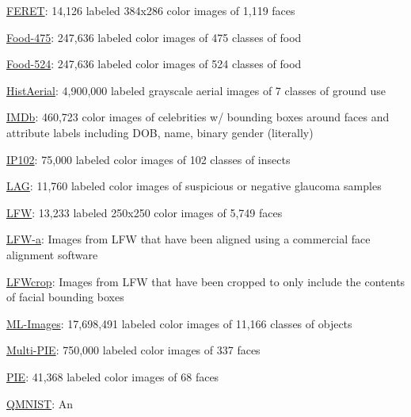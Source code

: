 \documentclass{tufte-handout}
\begin{document}
  \href{https://www.nist.gov/itl/iad/image-group/color-feret-database}{FERET}:
  14,126 labeled 384x286 color images of 1,119 faces
\item
  \href{http://www.ivl.disco.unimib.it/activities/food475db/}{Food-475}:
  247,636 labeled color images of 475 classes of food
\item
  \href{http://www.ivl.disco.unimib.it/activities/food524db/}{Food-524}:
  247,636 labeled color images of 524 classes of food
\item
  \href{http://eidolon.univ-lyon2.fr/~remi1/HistAerialDataset/}{HistAerial}:
  4,900,000 labeled grayscale aerial images of 7 classes of ground use
\item
  \href{https://data.vision.ee.ethz.ch/cvl/rrothe/imdb-wiki/}{IMDb}:
  460,723 color images of celebrities w/ bounding boxes around faces and
  attribute labels including DOB, name, binary gender (literally)
\item
  \href{https://github.com/xpwu95/IP102}{IP102}: 75,000 labeled color
  images of 102 classes of insects
\item
  \href{https://github.com/smilell/AG-CNN}{LAG}: 11,760 labeled color
  images of suspicious or negative glaucoma samples
\item
  \href{http://vis-www.cs.umass.edu/lfw/index.html}{LFW}: 13,233 labeled
  250x250 color images of 5,749 faces
\item
  \href{https://talhassner.github.io/home/projects/lfwa/index.html}{LFW-a}:
  Images from LFW that have been aligned using a commercial face
  alignment software
\item
  \href{http://conradsanderson.id.au/lfwcrop/}{LFWcrop}: Images from LFW
  that have been cropped to only include the contents of facial bounding
  boxes
\item
  \href{https://github.com/Tencent/tencent-ml-images}{ML-Images}:
  17,698,491 labeled color images of 11,166 classes of objects
\item
  \href{http://www.cs.cmu.edu/afs/cs/project/PIE/MultiPie/Multi-Pie/Home.html}{Multi-PIE}:
  750,000 labeled color images of 337 faces
\item
  \href{https://www.ri.cmu.edu/project/pie-database/}{PIE}: 41,368
  labeled color images of 68 faces
\item
  \href{https://github.com/facebookresearch/qmnist}{QMNIST}: An
\end{document}
